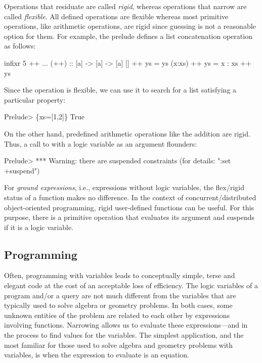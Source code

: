 Operations that residuate are called
\emph{rigid},
whereas operations that narrow are called
\emph{flexible}.
All defined operations are flexible
whereas most primitive operations,
like arithmetic operations, are rigid since guessing is not
a reasonable option for them.
For example, the prelude defines a list concatenation
operation as follows:
%
\begin{curry}
infixr 5 ++
...
(++)          :: [a] -> [a] -> [a]
[]     ++ ys  = ys
(x:xs) ++ ys  = x : xs ++ ys
\end{curry}
%
Since the operation \ccode{++} is flexible, we can use it to search for
a list satisfying a particular property:
%
\begin{prog}
Prelude> 
\{xs=[1,2]\} True
\end{prog}
%
On the other hand, predefined arithmetic operations like the addition \ccode{+}
are rigid. Thus, a call to \ccode{+} with a logic variable as an argument
flounders:
%
\begin{prog}
Prelude> 
*** Warning: there are suspended constraints (for details: ":set +suspend")
\end{prog}
%
For \emph{ground expressions},
i.e., expressions without logic variables, the flex/rigid status of
a function makes no difference.
In the context of concurrent/distributed object-oriented programming,
rigid user-defined functions can be useful.
For this purpose, there is a primitive operation
that evaluates its argument and suspends if it is a logic variable.


\subsection{Programming}

Often, programming with variables leads
to conceptually simple, terse and elegant code
at the cost of an acceptable loss of efficiency.
The logic variables of a program and/or a query
are not much different from the variables that are typically
used to solve algebra or geometry problems.
In both cases, some unknown entities of the problem
are related to each other by expressions involving functions.
Narrowing allows us to evaluate these expressions---and
in the process to find values for the variables.
The simplest application, and the most familiar for
those used to solve algebra and geometry problems with variables,
is when the expression to evaluate is an equation.

